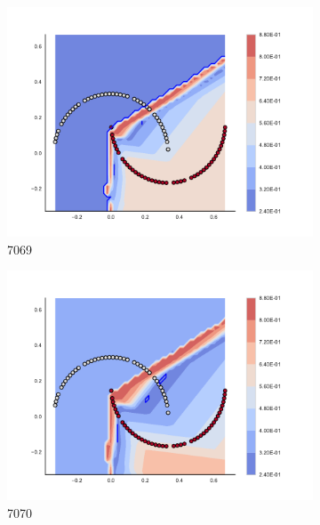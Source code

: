 \begin{figure}[h]
\begin{subfigure}[b]{0.09\textwidth}
    \includegraphics[clip, trim=2.35cm 1.75cm 4.5cm 0cm,width=\textwidth]{img/convergence/7069.pdf}
    \caption{7069}
    \label{fig:convergence_7069}
\end{subfigure}
%
\begin{subfigure}[b]{0.09\textwidth}
    \includegraphics[clip, trim=2.35cm 1.75cm 4.5cm 0cm,width=\textwidth]{img/convergence/7070.pdf}
    \caption{7070}
    \label{fig:convergence_7070}
\end{subfigure}
%
\begin{subfigure}[b]{0.09\textwidth}

\end{subfigure}
\end{figure}
